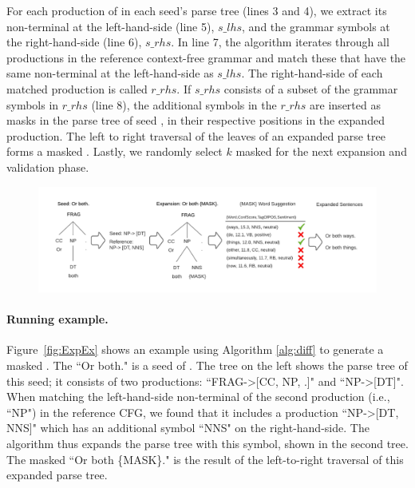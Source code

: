 


For each production of in each seed's parse tree (lines 3 and 4), we
extract its non-terminal at the left-hand-side (line 5), $s\_lhs$, and
the grammar symbols at the right-hand-side (line 6), $s\_rhs$. In line
7, the algorithm iterates through all productions in the reference
context-free grammar and match these that have the same non-terminal
at the left-hand-side as $s\_lhs$.  The right-hand-side of each
matched production is called $r\_rhs$.  If $s\_rhs$ consists of a
subset of the grammar symbols in $r\_rhs$ (line 8), the additional
symbols in the $r\_rhs$ are inserted as masks in the parse tree of
seed \sent, in their respective positions in the expanded
production.  The left to right traversal of the leaves of an expanded
parse tree forms a masked \sent.  Lastly, we randomly select $k$
masked \sents for the next \sent expansion and validation phase.

\begin{figure}[t]
  \centering
  \includegraphics[scale=0.7]{figs/running_example.pdf}
  \caption{\RunningExCaption}
\end{figure}

\paragraph{Running example.} Figure~\ref{fig:ExpEx} shows an example using Algorithm \ref{alg:diff}
to generate a masked \sent. The \sent ``Or both." is a seed of
 \lc.  The tree on the left shows the
parse tree of this seed; it consists of two productions: ``FRAG->[CC,
  NP, .]" and ``NP->[DT]".  When matching the left-hand-side
non-terminal of the second production (i.e., ``NP") in the reference
CFG, we found that it includes a production ``NP->[DT, NNS]" which has
an additional symbol ``NNS" on the right-hand-side.  The algorithm
thus expands the parse tree with this symbol, shown in the second
tree.  The masked \sent ``Or both \{MASK\}." is the result of the
left-to-right traversal of this expanded parse tree.

